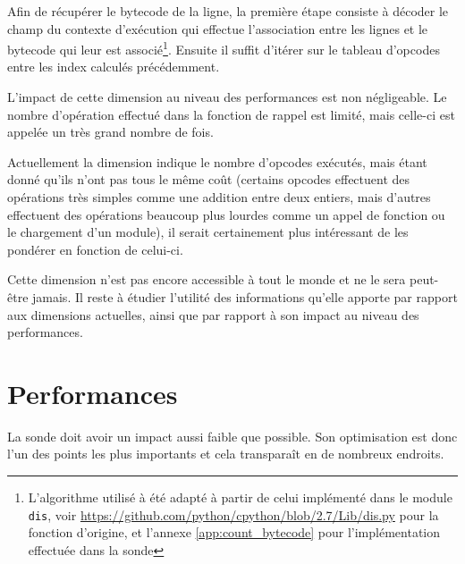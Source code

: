Afin de récupérer le \gls{bytecode} de la ligne, la première étape consiste à décoder le champ du contexte d'exécution qui effectue l'association entre les lignes et le \gls{bytecode} qui leur est associé\footnote{L'algorithme utilisé à été adapté à partir de celui implémenté dans le module \verb?dis?, voir \url{https://github.com/python/cpython/blob/2.7/Lib/dis.py} pour la fonction d'origine, et l'annexe \vref{app:count_bytecode} pour l'implémentation effectuée dans la sonde}. Ensuite il suffit d'itérer sur le tableau d'\glspl{opcode} entre les index calculés précédemment.

\begin{note}[Performances]
L'impact de cette dimension au niveau des performances est non négligeable. Le nombre d'opération effectué dans la fonction de rappel est limité, mais celle-ci est appelée un très grand nombre de fois.
\end{note}

\begin{note}[Évolutions]
Actuellement la dimension indique le nombre d'\glspl{opcode} exécutés, mais étant donné qu'ils n'ont pas tous le même coût (certains \glspl{opcode} effectuent des opérations très simples comme une addition entre deux entiers, mais d'autres effectuent des opérations beaucoup plus lourdes comme un appel de fonction ou le chargement d'un module), il serait certainement plus intéressant de les pondérer en fonction de celui-ci.
\end{note}

\begin{note}
Cette dimension n'est pas encore accessible à tout le monde et ne le sera peut-être jamais. Il reste à étudier l'utilité des informations qu'elle apporte par rapport aux dimensions actuelles, ainsi que par rapport à son impact au niveau des performances.
\end{note}

  \section{Performances}
  \label{sec:performances}
      
La sonde doit avoir un impact aussi faible que possible. Son optimisation est donc l'un des points les plus importants et cela transparaît en de nombreux endroits.

